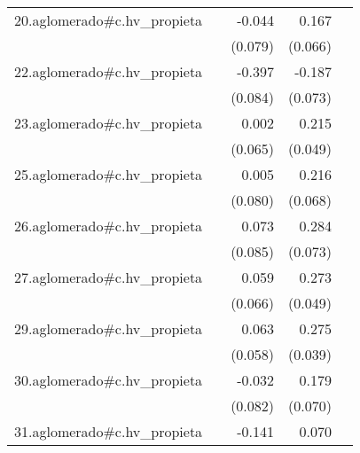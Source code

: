 {\begin{longtable}{l*{4}{D{.}{.}{-1}}}
\addlinespace
20.aglomerado#c.hv\_propieta&                     &      -0.044         &       0.167\sym{*}  &                     \\
            &                     &     (0.079)         &     (0.066)         &                     \\
\addlinespace
22.aglomerado#c.hv\_propieta&                     &      -0.397\sym{***}&      -0.187\sym{*}  &                     \\
            &                     &     (0.084)         &     (0.073)         &                     \\
\addlinespace
23.aglomerado#c.hv\_propieta&                     &       0.002         &       0.215\sym{***}&                     \\
            &                     &     (0.065)         &     (0.049)         &                     \\
\addlinespace
25.aglomerado#c.hv\_propieta&                     &       0.005         &       0.216\sym{**} &                     \\
            &                     &     (0.080)         &     (0.068)         &                     \\
\addlinespace
26.aglomerado#c.hv\_propieta&                     &       0.073         &       0.284\sym{***}&                     \\
            &                     &     (0.085)         &     (0.073)         &                     \\
\addlinespace
27.aglomerado#c.hv\_propieta&                     &       0.059         &       0.273\sym{***}&                     \\
            &                     &     (0.066)         &     (0.049)         &                     \\
\addlinespace
29.aglomerado#c.hv\_propieta&                     &       0.063         &       0.275\sym{***}&                     \\
            &                     &     (0.058)         &     (0.039)         &                     \\
\addlinespace
30.aglomerado#c.hv\_propieta&                     &      -0.032         &       0.179\sym{*}  &                     \\
            &                     &     (0.082)         &     (0.070)         &                     \\
\addlinespace
31.aglomerado#c.hv\_propieta&                     &      -0.141         &       0.070         &                     \\

\end{longtable}}
